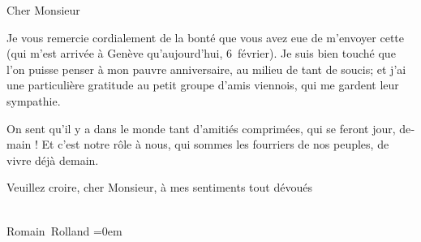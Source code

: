 \pstart{}\begin{otherlanguage}{french}Cher Monsieur\end{otherlanguage}\pend\vspace{0.5em}
\pstart
           \begin{otherlanguage}{french}Je vous remercie cordialement de la bonté que vous avez eue de
                  m’envoyer cette \label{K_L03883-2v}\label{K_L03883-2} (qui m’est arrivée à Genève qu’aujourd’hui, 6 février). Je suis bien touché que
                  l’on puisse penser à mon pauvre anniversaire, au milieu de tant de soucis; et j’ai
                  une particulière gratitude au petit groupe d’amis viennois, qui me gardent leur sympathie.\end{otherlanguage}\pend
           
\pstart
           \begin{otherlanguage}{french}On sent qu’il y a dans {\pb}le monde tant d’amitiés comprimées, qui
                  se feront jour, demain ! Et c’est notre rôle à nous, qui  sommes les fourriers de nos peuples, de vivre déjà
                  demain.\end{otherlanguage}\pend
           
\pstart
           \begin{otherlanguage}{french}Veuillez croire, cher Monsieur, à mes sentiments tout
                  dévoués\end{otherlanguage}{\\[\baselineskip]}\spacefill\mbox{Romain Rolland}\pend
           \leftskip=0em{}\endnumbering{}
\begin{anhang}
\end{anhang}\newcommand{\dateiname}{L03883}\newcommand{\titel}{Romain Rolland an Arthur Schnitzler, 6. 2. 1916}\newcommand{\editorInnen}{Selma Jahnke und Martin Anton Müller}
